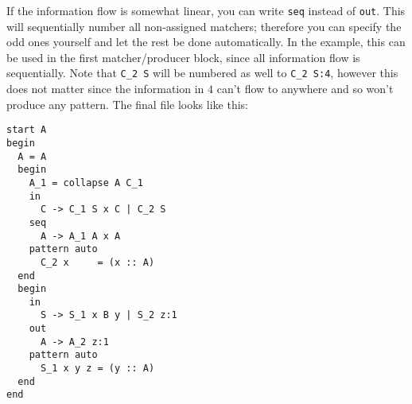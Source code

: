 \documentclass[a4paper]{article}
\begin{document}
If the information flow is somewhat linear, you can write \lstinline{seq} instead of \lstinline{out}. This will sequentially number all non-assigned matchers; therefore you can specify the odd ones yourself and let the rest be done automatically. In the example, this can be used in the first matcher/producer block, since all information flow is sequentially. Note that \lstinline{C_2 S} will be numbered as well to \lstinline{C_2 S:4}, however this does not matter since the information in $4$ can't flow to anywhere and so won't produce any pattern. The final file looks like this:
\begin{lstlisting}[language=transformer]
start A
begin
  A = A
  begin
    A_1 = collapse A C_1 
    in
      C -> C_1 S x C | C_2 S
    seq
      A -> A_1 A x A
    pattern auto
      C_2 x     = (x :: A)
  end
  begin
    in
      S -> S_1 x B y | S_2 z:1
    out
      A -> A_2 z:1
    pattern auto
      S_1 x y z = (y :: A)
  end  
end
\end{lstlisting}
\end{document}
